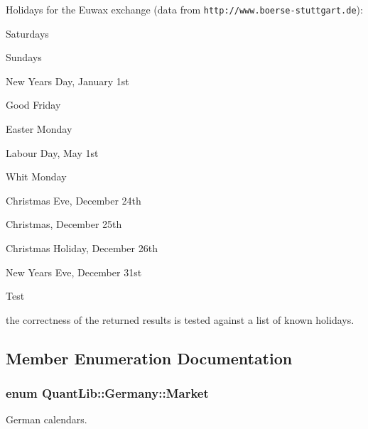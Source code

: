 Holidays for the Euwax exchange (data from {\tt http\+://www.\+boerse-\/stuttgart.\+de})\+: 
\begin{DoxyItemize}
\item Saturdays 
\item Sundays 
\item New Year\textquotesingle{}s Day, January 1st 
\item Good Friday 
\item Easter Monday 
\item Labour Day, May 1st 
\item Whit Monday 
\item Christmas\textquotesingle{} Eve, December 24th 
\item Christmas, December 25th 
\item Christmas Holiday, December 26th 
\item New Year\textquotesingle{}s Eve, December 31st 
\end{DoxyItemize}

\begin{DoxyRefDesc}{Test}
\item[{\bf Test}]the correctness of the returned results is tested against a list of known holidays. \end{DoxyRefDesc}


\subsection{Member Enumeration Documentation}
\subsubsection[{Market}]{\setlength{\rightskip}{0pt plus 5cm}enum {\bf Quant\+Lib\+::\+Germany\+::\+Market}}\label{class_quant_lib_1_1_germany_a35bff784931d96af1311d35f663146a5}


German calendars. 

